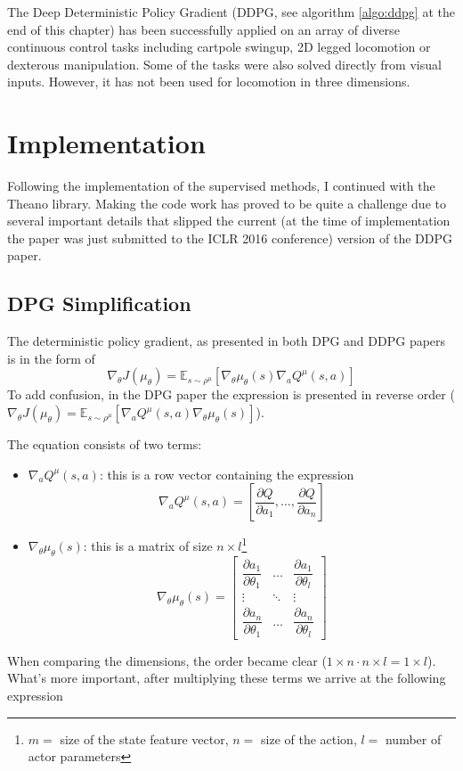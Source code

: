 The Deep Deterministic Policy Gradient (DDPG, see algorithm \ref{algo:ddpg} at the end of this chapter) has been successfully applied on an array of diverse continuous control tasks including cartpole swingup, 2D legged locomotion or dexterous manipulation. Some of the tasks were also solved directly from visual inputs. However, it has not been used for locomotion in three dimensions.

\section{Implementation}
Following the implementation of the supervised methods, I continued with the Theano library. Making the code work has proved to be quite a challenge due to several important details that slipped the current (at the time of implementation the paper was just submitted to the ICLR 2016 conference) version of the DDPG paper.

\subsection{DPG Simplification}
The deterministic policy gradient, as presented in both DPG and DDPG papers is in the form of
\[
\nabla_\theta J(\mu_\theta)= \mathbb{E}_{s\sim\rho^\mu}[\nabla_\theta \mu_\theta(s) \nabla_aQ^\mu(s,a)]
\]
To add confusion, in the DPG paper the expression is presented in reverse order ($\nabla_\theta J(\mu_\theta)= \mathbb{E}_{s\sim\rho^\mu}[\nabla_aQ^\mu(s,a)\nabla_\theta \mu_\theta(s)]$).

The equation consists of two terms:
\begin{itemize}
\item $\nabla_aQ^\mu(s,a)$: this is a row vector containing the expression 
\[ \nabla_aQ^\mu(s,a)=\left[ \dfrac{\partial Q}{\partial a_1}, \dots , \dfrac{\partial Q}{\partial a_n} \right] \]

\item $\nabla_\theta \mu_\theta(s)$:  this is a matrix of size $n \times l$\footnote{
$m=$ size of the state feature vector, 
$n=$ size of the action, 
$l=$ number of actor parameters
}
\[
  \nabla_\theta \mu_\theta(s)=
  \left[ {\begin{array}{ccc}
   \dfrac{\partial a_1}{\partial \theta_1} & \dots & \dfrac{\partial a_1}{\partial \theta_l}\\
\vdots & \ddots & \vdots \\
\dfrac{\partial a_n}{\partial \theta_1} & \dots & \dfrac{\partial a_n}{\partial \theta_l}

      \end{array} } \right]
\]
\end{itemize}
When comparing the dimensions, the order became clear ($1 \times n \cdot n \times l = 1 \times l$). What's more important, after multiplying these terms we arrive at the following expression

